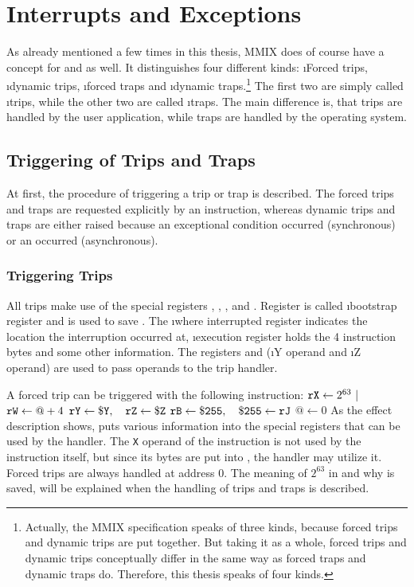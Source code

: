 \section{Interrupts and Exceptions}

As already mentioned a few times in this thesis, MMIX does of course have a concept for  and  as well. It distinguishes four different kinds: \i{Forced trips}, \i{dynamic trips}, \i{forced traps} and \i{dynamic traps}.\footnote{Actually, the MMIX specification speaks of three kinds, because forced trips and dynamic trips are put together. \citep[pg. 28]{mmix-doc} But taking it as a whole, forced trips and dynamic trips conceptually differ in the same way as forced traps and dynamic traps do. Therefore, this thesis speaks of four kinds.} The first two are simply called \i{trips}, while the other two are called \i{traps}. The main difference is, that trips are handled by the user application, while traps are handled by the operating system.

\subsection{Triggering of Trips and Traps}

At first, the procedure of triggering a trip or trap is described. The forced trips and traps are requested explicitly by an instruction, whereas dynamic trips and traps are either raised because an exceptional condition occurred (synchronous) or an  occurred (asynchronous).

\subsubsection{Triggering Trips}

All trips make use of the special registers , , ,  and . Register  is called \i{bootstrap register} and is used to save . The \i{where interrupted register}  indicates the location the interruption occurred at, \i{execution register}  holds the 4 instruction bytes and some other information. The registers  and  (\i{Y operand} and \i{Z operand}) are used to pass operands to the trip handler. \citep[pg. 28]{mmix-doc}

A forced trip can be triggered with the following instruction:
\instrtblfive
	{}
	{${\tt rX} \leftarrow 2^{63}~|$~}
	{${\tt rW} \leftarrow @ + 4$}
	{${\tt rY} \leftarrow {\tt \$Y},\quad {\tt rZ} \leftarrow {\tt \$Z}$}
	{${\tt rB} \leftarrow {\tt \$255},\quad {\tt \$255} \leftarrow {\tt rJ}$}
	{$@ \leftarrow 0$}
\noindent As the effect description shows,  puts various information into the special registers that can be used by the handler. The {\tt X} operand of the instruction is not used by the instruction itself, but since its bytes are put into , the handler may utilize it. Forced trips are always handled at address 0. \citep[pg. 28]{mmix-doc} The meaning of $2^{63}$ in  and why  is saved, will be explained when the handling of trips and traps is described.

